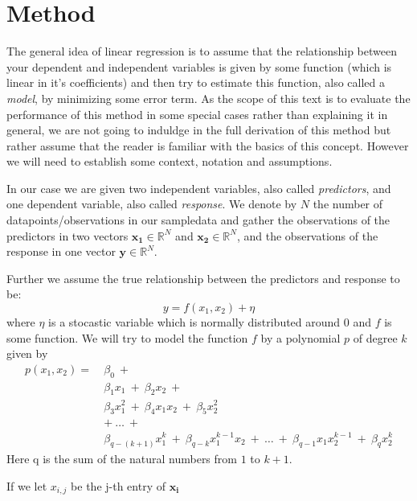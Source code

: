 \documentclass[a4paper,norsk]{article}
\begin{document}
\section{Method}
The general idea of linear regression is to assume that the relationship 
between your dependent and independent variables is given by some function 
(which is linear in it's coefficients)
and then try to estimate this function, also called a \textit{model}, 
by minimizing some error term. As the scope of this text is to evaluate the
performance of this method in some special cases rather than explaining it 
in general, we are not going to induldge in the full derivation 
of this method but rather assume that the reader is familiar with the 
basics of this concept. However we will need to establish some context, 
notation and assumptions.
\par
In our case we are given two independent variables, also called 
\textit{predictors}, 
and one dependent variable, also called 
\textit{response}. We denote by 
$N$ the number of 
datapoints/observations in our sampledata and gather the observations 
of the predictors in two vectors $\bm{x_1} \in \mathbb{R}^N$ and 
$\bm{x_2} \in \mathbb{R}^N$, and the observations of the response in one 
vector $\bm{y} \in \mathbb{R}^N$.
\par
Further we assume the true relationship between the predictors and 
response to be:
\begin{equation}
    y = f(x_1, x_2) + \eta
\end{equation}
where $\eta$ is a stocastic variable which is normally distributed 
around 0 and $f$ is some function. 
We will try to model the function $f$ by a polynomial $p$ of degree $k$ 
given by 
\begin{equation}
    \begin{split}
        p(x_1, x_2) = \ &\beta_0 \ + \\ 
        & \beta_1 x_1 \ + \ \beta_2 x_2 \ + \\
        & \beta_3 x_1^2 \ + \ \beta_4 x_1 x_2 \ + \ \beta_5 x_2^2 \\
        & + \ \dots \ + \\
        & \beta_{q-(k+1)} x_1^k \ + \ \beta_{q-k} x_1^{k-1} x_2 \ 
        + \ \dots \ + \ \beta_{q-1} x_1 x_2^{k-1} \ + \ \beta_q x_2^k
    \end{split}
\end{equation}
Here q is the sum of the natural numbers from $1$ to $k + 1$.
\par
If we let $x_{i,j}$ be the j-th entry of $\bm{x_i}$ 
\end{document}
